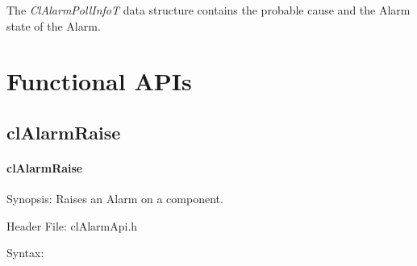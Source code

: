 \begin{flushleft}
The \textit{ClAlarmPollInfoT} data structure contains the probable cause and the Alarm state of the Alarm.



\newpage

\section{Functional APIs}
\subsection{clAlarmRaise}
\hypertarget{pageam103}{}\paragraph{cl\-Alarm\-Raise}\label{pageam103}
\begin{Desc}
\item[Synopsis:]Raises an Alarm on a component.\end{Desc}
\begin{Desc}
\item[Header File:]clAlarmApi.h\end{Desc}
\begin{Desc}
\item[Syntax:]


\end{Desc}
\end{flushleft}
